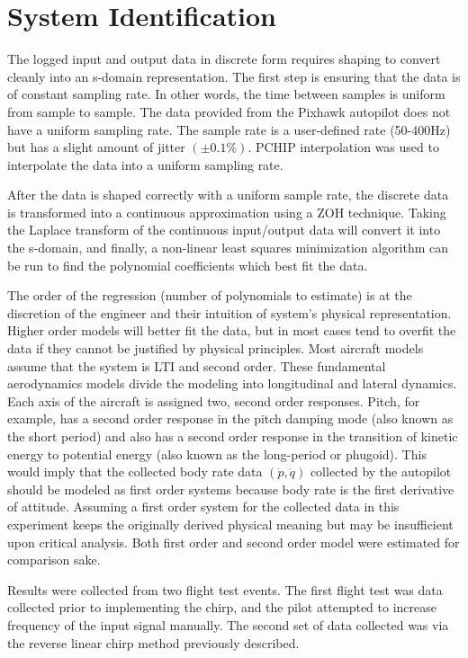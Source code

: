 \label{appendix:system_identification}
\section{System Identification}

The logged input and output data in discrete form requires shaping to convert cleanly into an s-domain representation.  The first step is ensuring that the data is of constant sampling rate.  In other words, the time between samples is uniform from sample to sample.  The data provided from the Pixhawk autopilot does not have a uniform sampling rate.  The sample rate is a user-defined rate (50-400Hz) but has a slight amount of jitter $(\pm 0.1\%)$.  \ac{PCHIP} interpolation was used to interpolate the data into a uniform sampling rate.

After the data is shaped correctly with a uniform sample rate, the discrete data is transformed into a continuous approximation using a \ac{ZOH} technique.  Taking the Laplace transform of the continuous input/output data will convert it into the s-domain, and finally, a non-linear least squares minimization algorithm can be run to find the polynomial coefficients which best fit the data.

The order of the regression (number of polynomials to estimate) is at the discretion of the engineer and their intuition of system's physical representation.  Higher order models will better fit the data, but in most cases tend to overfit the data if they cannot be justified by physical principles.  Most aircraft models assume that the system is \ac{LTI} and second order.  These fundamental aerodynamics models divide the modeling into longitudinal and lateral dynamics.  Each axis of the aircraft is assigned two, second order responses.  Pitch, for example, has a second order response in the pitch damping mode (also known as the short period) and also has a second order response in the transition of kinetic energy to potential energy (also known as the long-period or phugoid).  This would imply that the collected body rate data $(\dot{p},\dot{q})$ collected by the autopilot should be modeled as first order systems because body rate is the first derivative of attitude.  Assuming a first order system for the collected data in this experiment keeps the originally derived physical meaning but may be insufficient upon critical analysis.  Both first order and second order model were estimated for comparison sake.

Results were collected from two flight test events.  The first flight test was data collected prior to implementing the chirp, and the pilot attempted to increase frequency of the input signal manually.  The second set of data collected was via the reverse linear chirp method previously described.  

